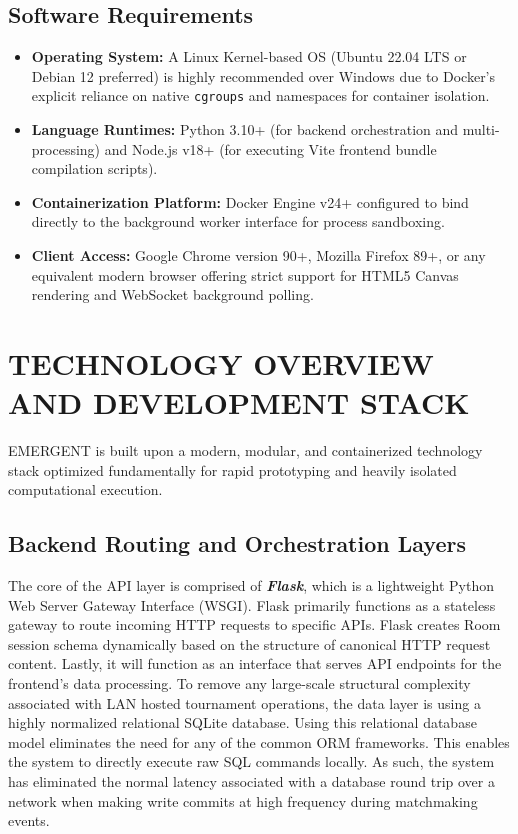 \documentclass[12pt,a4paper]{report}
\begin{document}
\subsection{Software Requirements}
\begin{itemize}
    \item \textbf{Operating System:} A Linux Kernel-based OS (Ubuntu 22.04 LTS or Debian 12 preferred) is highly recommended over Windows due to Docker's explicit reliance on native \texttt{cgroups} and namespaces for container isolation.
    \item \textbf{Language Runtimes:} Python 3.10+ (for backend orchestration and multi-processing) and Node.js v18+ (for executing Vite frontend bundle compilation scripts).
    \item \textbf{Containerization Platform:} Docker Engine v24+ configured to bind directly to the background worker interface for process sandboxing.
    \item \textbf{Client Access:} Google Chrome version 90+, Mozilla Firefox 89+, or any equivalent modern browser offering strict support for HTML5 Canvas rendering and WebSocket background polling.
\end{itemize}

\section{TECHNOLOGY OVERVIEW AND DEVELOPMENT STACK}
EMERGENT is built upon a modern, modular, and containerized technology stack optimized fundamentally for rapid prototyping and heavily isolated computational execution. 

\subsection{Backend Routing and Orchestration Layers}
The core of the API layer is comprised of \textit{\textbf{Flask}}, which is a lightweight Python Web Server Gateway Interface (WSGI). Flask primarily functions as a stateless gateway to route incoming HTTP requests to specific APIs. Flask creates Room session schema dynamically based on the structure of canonical HTTP request content. Lastly, it will function as an interface that serves API endpoints for the frontend's data processing. To remove any large-scale structural complexity associated with LAN hosted tournament operations, the data layer is using a highly normalized relational SQLite database. Using this relational database model eliminates the need for any of the common ORM frameworks. This enables the system to directly execute raw SQL commands locally. As such, the system has eliminated the normal latency associated with a database round trip over a network when making write commits at high frequency during matchmaking events.
\end{document}
